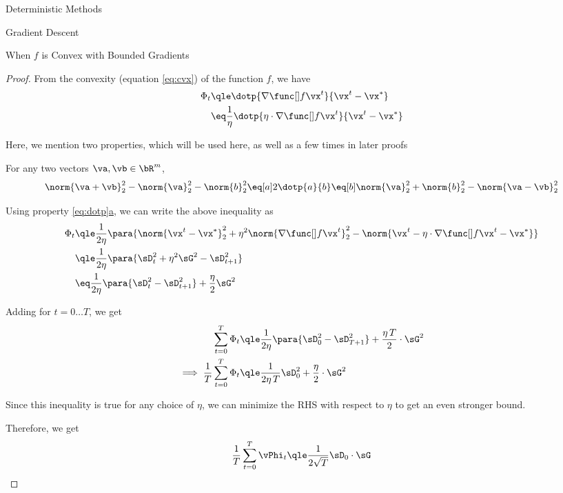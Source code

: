 \documentclass{article}
\begin{document}
\begin{psection}{Deterministic Methods}
\begin{psubsection}{Gradient Descent}
\begin{pssubsection}{When $f$ is Convex with Bounded Gradients}
\begin{theorem}
				\begin{proof}
					From the convexity (equation \ref{eq:cvx}) of the function $f$, we have
					\begin{align*}
						\Phi_t	&\qle	\dotp{\gf{t}}{\x{t} - \xs} \\
						&\eq	\frac{1}{\eta} \dotp{\eta \cdot \gf{t}}{\x{t} - \xs}
					\end{align*}

					Here, we mention two properties, which will be used here, as well as a few times in later proofs

					\begin{property}
						For any two vectors $\va, \vb \in \bR^m$,
						\begin{equation}
							\norm{\va + \vb}_2^2 - \norm{\va}_2^2 - \norm{b}_2^2	\eq[a]	2\dotp{a}{b}	\eq[b]	\norm{\va}_2^2 + \norm{b}_2^2 - \norm{\va - \vb}_2^2
							\label{eq:dotp}
						\end{equation}
					\end{property}

					Using property \hyperref[eq:dotp]{\ref*{eq:dotp}a}, we can write the above inequality as
					\begin{align*}
						\Phi_t	&\qle	\frac{1}{2 \eta} \para{\norm{\x{t} - \xs}_2^2 + \eta^2 \norm{\gf{t}}_2^2 - \norm{\x{t} - \eta \cdot \gf{t} - \xs}} \\
						&\qle	\frac{1}{2 \eta} \para{\sD_t^2 + \eta^2 \sG^2 - \sD_{t + 1}^2} \\
						&\eq	\frac{1}{2 \eta} \para{\sD_t^2 - \sD_{t + 1}^2} + \frac{\eta}{2} \sG^2
					\end{align*}

					Adding for $t = 0 \dots T$, we get
					\begin{align*}
						\sum_{t = 0}^T	\Phi_t						&\qle	\frac{1}{2 \eta} \para{\sD_0^2 - \sD_{T+1}^2} + \frac{\eta\,T}{2} \cdot \sG^2 \\
						\implies \frac{1}{T} \sum_{t = 0}^T	\Phi_t	&\qle	\frac{1}{2 \eta \, T} \sD_0^2 + \frac{\eta}{2} \cdot \sG^2
					\end{align*}

					Since this inequality is true for any choice of $\eta$, we can minimize the RHS with respect to $\eta$ to get an even stronger bound.

					Therefore, we get
					\begin{align*}
						\frac{1}{T} \sum_{t = 0}^T \vPhi_t \qle \frac{1}{2 \sqrt{T}}\sD_0 \cdot \sG
					\end{align*}


\end{proof}
\end{theorem}
\end{pssubsection}
\end{psubsection}
\end{psection}
\end{document}
